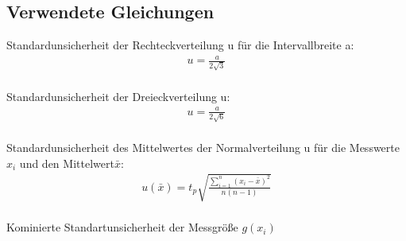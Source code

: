 

\subsection{Verwendete Gleichungen}\label{VGuD}







Standardunsicherheit der Rechteckverteilung u für die Intervallbreite a:
\begin{align}
	u=\frac{a}{2\sqrt{3}}\label{eq:sur}
	\end{align} \\	
Standardunsicherheit der Dreieckverteilung u: \begin{align}
	u=\frac{a}{2\sqrt{6}}\label{eq:sud}
\end{align}\\
Standardunsicherheit des Mittelwertes der Normalverteilung u für die Messwerte $x_i$ und den Mittelwert$\bar{x}$:
\begin{align}
	u(\bar{x})=  t_p  \sqrt{  \frac{\sum_{i=1}^{n}  (x_i-\bar{x})^2} {n (n-1)} }
	\label{eq:sunv}       
\end{align} \\
Kominierte Standartunsicherheit der Messgröße $g(x_i)$

